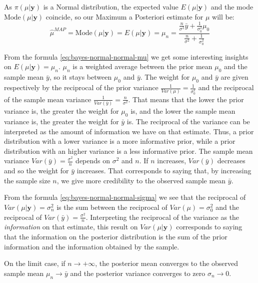 \documentclass[a4paper, twoside, openright, 12pt]{report}
\theoremstyle{definition}
\theoremstyle{definition}
\theoremstyle{definition}
\theoremstyle{remark}
\begin{document}
As \(\pi(\mu|\boldsymbol{y})\) is a Normal distribution, the expected value \(E(\mu|\boldsymbol{y})\) and the mode \(\text{Mode}(\mu|\boldsymbol{y})\) coincide, so our Maximum a Posteriori estimate for \(\mu\) will be:
\[
\hat{\mu}^{MAP} = \text{Mode}(\mu|\boldsymbol{y}) = E(\mu|\boldsymbol{y}) = \mu_n = \frac{\frac{n}{\sigma^2}\bar{y} + \frac{1}{\sigma_0^2}\mu_0}{ \frac{n}{\sigma^2} + \frac{1}{\sigma_0^2}}
\]

From the formula \eqref{eq:bayes-normal-normal-mu} we get some interesting insights on \(E(\mu|\boldsymbol{y})=\mu_n\). \(\mu_n\) is a weighted average between the prior mean \(\mu_0\) and the sample mean \(\bar{y}\), so it stays between \(\mu_0\) and \(\bar{y}\). The weight for \(\mu_0\) and \(\bar{y}\) are given respectively by the reciprocal of the prior variance \(\frac{1}{Var(\mu)}=\frac{1}{\sigma_0^2}\) and the reciprocal of the sample mean variance \(\frac{1}{Var(\bar{y})}=\frac{n}{\sigma^2}\). That means that the lower the prior variance is, the greater the weight for \(\mu_0\) is, and the lower the sample mean variance is, the greater the weight for \(\bar{y}\) is. The reciprocal of the variance can be interpreted as the amount of information we have on that estimate. Thus, a prior distribution with a lower variance is a more informative prior, while a prior distribution with an higher variance is a less informative prior. The sample mean variance \(Var(\bar{y})=\frac{\sigma^2}{n}\) depends on \(\sigma^2\) and \(n\). If \(n\) increases, \(Var(\bar{y})\) decreases and so the weight for \(\bar{y}\) increases. That corresponds to saying that, by increasing the sample size \(n\), we give more credibility to the observed sample mean \(\bar{y}\).

From the formula \eqref{eq:bayes-normal-normal-sigma} we see that the reciprocal of \(Var(\mu|\boldsymbol{y})=\sigma_n^2\) is the sum between the reciprocal of \(Var(\mu)=\sigma_0^2\) and the reciprocal of \(Var(\bar{y})=\frac{\sigma^2}{n}\). Interpreting the reciprocal of the variance as the \emph{information} on that estimate, this result on \(Var(\mu|\boldsymbol{y})\) corresponds to saying that the information on the posterior distribution is the sum of the prior information and the information obtained by the sample.

On the limit case, if \(n\to +\infty\), the posterior mean converges to the observed sample mean \(\mu_n\to \bar{y}\) and the posterior variance converges to zero \(\sigma_n\to 0\).
\end{document}
